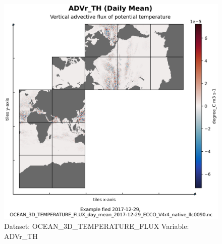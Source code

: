\begin{figure}[H]
\centering
\includegraphics[width=\textwidth]{../images/plots/native_plots/Ocean_Three-Dimensional_Potential_Temperature_Fluxes/ADVr_TH.png}
\caption{Dataset: OCEAN\_3D\_TEMPERATURE\_FLUX Variable: ADVr\_TH}
\label{tab:table-OCEAN_3D_TEMPERATURE_FLUX_ADVr_TH-Plot}
\end{figure}
\pagebreak
